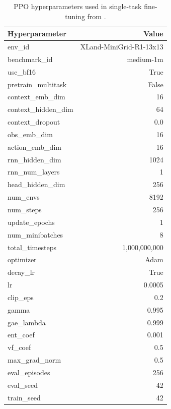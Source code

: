 \documentclass{article}
\begin{document}
\begin{table}[h!]
    \begin{small}
    \begin{center}
    \caption{PPO hyperparameters used in single-task fine-tuning from .}
    \label{table:ppo-hparams}
        \begin{tabular}{lr}
		\toprule
            \textbf{Hyperparameter} & \textbf{Value} \\
		\midrule
            env\_id                 & XLand-MiniGrid-R1-13x13 \\
            benchmark\_id           & medium-1m \\
            use\_bf16               & True \\
            pretrain\_multitask     & False \\
            context\_emb\_dim       & 16 \\
            context\_hidden\_dim    & 64 \\
            context\_dropout        & 0.0 \\
            obs\_emb\_dim           & 16 \\
            action\_emb\_dim        & 16 \\
            rnn\_hidden\_dim        & 1024 \\
            rnn\_num\_layers        & 1 \\
            head\_hidden\_dim       & 256 \\
            num\_envs               & 8192 \\
            num\_steps              & 256 \\
            update\_epochs          & 1 \\
            num\_minibatches        & 8 \\
            total\_timesteps        & 1,000,000,000 \\
            optimizer               & Adam \\
            decay\_lr               & True \\
            lr                      & 0.0005 \\
            clip\_eps               & 0.2 \\
            gamma                   & 0.995 \\
            gae\_lambda             & 0.999 \\
            ent\_coef               & 0.001 \\
            vf\_coef                & 0.5 \\
            max\_grad\_norm         & 0.5 \\
            eval\_episodes          & 256 \\
            eval\_seed              & 42 \\
            train\_seed             & 42 \\
		\bottomrule
		\end{tabular}
    \end{center}
    \end{small}
\end{table}

\clearpage
\end{document}

